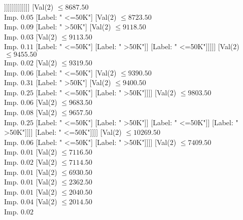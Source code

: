 \documentclass[margin=10pt]{standalone}
\begin{document}
\begin{forest}
																																	[Label: " >50K"]
																																	[Label: " <=50K"]]]]]]]]]]]]]]
																				[Val($2$) $ \leq 8687.50$ \\ Imp. $0.05$
																					[Label: " <=50K"]
																					[Val($2$) $ \leq 8723.50$ \\ Imp. $0.09$
																						[Label: " >50K"]
																						[Val($2$) $ \leq 9118.50$ \\ Imp. $0.03$
																							[Val($2$) $ \leq 9113.50$ \\ Imp. $0.11$
																								[Label: " <=50K"]
																								[Label: " >50K"]]
																							[Label: " <=50K"]]]]]
																			[Val($2$) $ \leq 9455.50$ \\ Imp. $0.02$
																				[Val($2$) $ \leq 9319.50$ \\ Imp. $0.06$
																					[Label: " <=50K"]
																					[Val($2$) $ \leq 9390.50$ \\ Imp. $0.31$
																						[Label: " >50K"]
																						[Val($2$) $ \leq 9400.50$ \\ Imp. $0.25$
																							[Label: " <=50K"]
																							[Label: " >50K"]]]]
																				[Val($2$) $ \leq 9803.50$ \\ Imp. $0.06$
																					[Val($2$) $ \leq 9683.50$ \\ Imp. $0.08$
																						[Val($2$) $ \leq 9657.50$ \\ Imp. $0.25$
																							[Label: " <=50K"]
																							[Label: " >50K"]]
																						[Label: " <=50K"]]
																					[Label: " >50K"]]]]
																		[Label: " <=50K"]]]]
															[Val($2$) $ \leq 10269.50$ \\ Imp. $0.06$
																[Label: " <=50K"]
																[Label: " >50K"]]]]
													[Val($2$) $ \leq 7409.50$ \\ Imp. $0.01$
														[Val($2$) $ \leq 7116.50$ \\ Imp. $0.02$
															[Val($2$) $ \leq 7114.50$ \\ Imp. $0.01$
																[Val($2$) $ \leq 6930.50$ \\ Imp. $0.01$
																	[Val($2$) $ \leq 2362.50$ \\ Imp. $0.01$
																		[Val($2$) $ \leq 2040.50$ \\ Imp. $0.04$
																			[Val($2$) $ \leq 2014.50$ \\ Imp. $0.02$

\end{forest}
\end{document}
